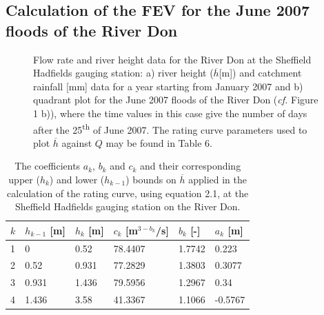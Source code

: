 \documentclass[11pt,a4paper]{article}
\begin{document}
\subsection{Calculation of the FEV for the June 2007 floods of the River Don}
\begin{figure}[H]
\centering
{}
\hfill
{}
\caption{Flow rate and river height data for the River Don at the Sheffield Hadfields gauging station: a) river height ($\overline{h}$[m]) \cite{Calder-Don} and catchment rainfall [mm] data \cite{NRFA} for a year starting from January 2007 and b) quadrant plot for the June 2007 floods of the River Don (\textit{cf.} Figure 1 b)), where the time values in this case give the number of days after the 25\textsuperscript{th} of June 2007. The rating curve parameters used to plot $\overline{h}$ against $Q$ may be found in Table 6.}
\end{figure}

\begin{table}[H]
\centering
\begin{tabular}{l|l|l|l|l|l}
$k$ & $h_{k-1}$ [m] & $h_k$ [m] & $c_k$ [m$^{3-b_k}$/s] & $b_k$ [-] & $a_k$ [m]\\
\hline
1 & 0 & 0.52 & 78.4407 & 1.7742 & 0.223 \\
2 & 0.52 & 0.931 & 77.2829 & 1.3803 & 0.3077 \\
3 & 0.931 & 1.436 & 79.5956 & 1.2967 & 0.34 \\
4 & 1.436 & 3.58 & 41.3367 & 1.1066 & -0.5767 \\
\end{tabular}
\caption{The coefficients $a_k$, $b_k$ and $c_k$ and their corresponding upper ($h_k$) and lower ($h_{k-1}$) bounds on $\overline{h}$ \cite{Calder-Don} applied in the calculation of the rating curve, using equation 2.1, at the Sheffield Hadfields gauging station on the River Don.}
\end{table}
\end{document}

